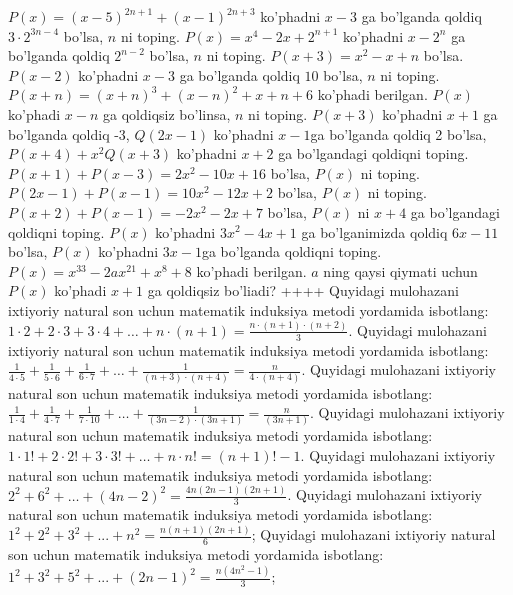 \(P(x) = (x - 5)^{2n + 1} + (x - 1)^{2n + 3}\) ko'phadni \(x - 3\) ga bo'lganda qoldiq \(3 \cdot 2^{3n - 4}\) bo'lsa, \(n\) ni toping.
\(P(x) = x^{4} - 2x + 2^{n + 1}\) ko'phadni \(x - 2^{n}\) ga bo'lganda qoldiq \(2^{n - 2}\) bo'lsa, \(n\) ni toping.
\(P(x + 3) = x^{2} - x + n\) bo'lsa. \(P(x - 2)\) ko'phadni \(x - 3\) ga bo'lganda qoldiq \(10\) bo'lsa, \(n\) ni toping.
\(P(x + n) = (x + n)^{3} + (x - n)^{2} + x + n + 6\) ko'phadi berilgan. \(P(x)\) ko'phadi \(x - n\) ga qoldiqsiz bo'linsa, \(n\) ni toping.
\(P(x + 3)\) ko'phadni \(x + 1\) ga bo'lganda qoldiq -3, \(Q(2x - 1)\) ko'phadni \(x - 1\)ga bo'lganda qoldiq 2 bo'lsa, \(P(x + 4) + x^{2}Q(x + 3)\) ko'phadni \(x + 2\) ga bo'lgandagi qoldiqni toping.
\(P(x + 1) + P(x - 3) = 2x^{2} - 10x + 16\) bo'lsa, \(P(x)\) ni toping.
\(P(2x - 1) + P(x - 1) = 10x^{2} - 12x + 2\) bo'lsa, \(P(x)\) ni toping.
\(P(x + 2) + P(x - 1) = - 2x^{2} - 2x + 7\) bo'lsa, \(P(x)\) ni \(x + 4\) ga bo'lgandagi qoldiqni toping.
\(P(x)\) ko'phadni \(3x^{2} - 4x + 1\) ga bo'lganimizda qoldiq \(6x - 11\) bo'lsa, \(P(x)\) ko'phadni \(3x - 1\)ga bo'lganda qoldiqni toping.
\(P(x) = x^{33} - 2ax^{21} + x^{8} + 8\) ko'phadi berilgan. \(a\) ning qaysi qiymati uchun \(P(x)\) ko'phadi \(x + 1\) ga qoldiqsiz bo'liadi?
++++
Quyidagi mulohazani ixtiyoriy natural son uchun matematik induksiya metodi yordamida isbotlang: \(1 \cdot 2 + 2 \cdot 3 + 3 \cdot 4 + \ldots + n \cdot (n + 1) = \frac{n \cdot (n + 1) \cdot (n + 2)}{3}\).
Quyidagi mulohazani ixtiyoriy natural son uchun matematik induksiya metodi yordamida isbotlang: \(\frac{1}{4 \cdot 5} + \frac{1}{5 \cdot 6} + \frac{1}{6 \cdot 7} + \ldots + \frac{1}{(n + 3) \cdot (n + 4)} = \frac{n}{4 \cdot (n + 4)}\).
Quyidagi mulohazani ixtiyoriy natural son uchun matematik induksiya metodi yordamida isbotlang: \(\frac{1}{1 \cdot 4} + \frac{1}{4 \cdot 7} + \frac{1}{7 \cdot 10} + \ldots + \frac{1}{(3n - 2) \cdot (3n + 1)} = \frac{n}{(3n + 1)}\).
Quyidagi mulohazani ixtiyoriy natural son uchun matematik induksiya metodi yordamida isbotlang: \(1 \cdot 1! + 2 \cdot 2! + 3 \cdot 3! + \ldots + n \cdot n! = (n + 1)! - 1\).
Quyidagi mulohazani ixtiyoriy natural son uchun matematik induksiya metodi yordamida isbotlang: \(2^{2} + 6^{2} + \ldots + (4n - 2)^{2} = \frac{4n(2n - 1)(2n + 1)}{3}\).
Quyidagi mulohazani ixtiyoriy natural son uchun matematik induksiya metodi yordamida isbotlang: \(1^{2} + 2^{2} + 3^{2} + ... + n^{2} = \frac{n(n + 1)(2n + 1)}{6}\);
Quyidagi mulohazani ixtiyoriy natural son uchun matematik induksiya metodi yordamida isbotlang: \(1^{2} + 3^{2} + 5^{2} + ... + (2n - 1)^{2} = \frac{n\left( 4n^{2} - 1 \right)}{3}\);
